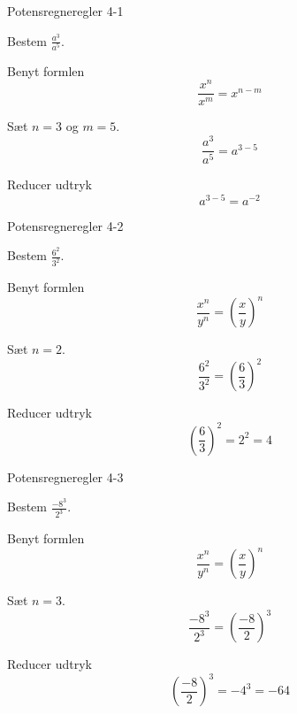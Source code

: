 \documentclass{article}
\begin{document}
\tableofcontents
\newpage

\begin{exercise}{Potensregneregler 4-1}

Bestem $\frac{a^3}{a^5}$.


\hint

Benyt formlen
\[
\frac{x^n}{x^m} = x^{n-m}
\]

\hint

Sæt $n = 3$ og $m=5$.
\[
\frac{a^3}{a^5} = a^{3-5}
\]

\hint 

Reducer udtryk
\[
a^{3-5} = a^{-2}
\]
\end{exercise}

\newpage

\begin{exercise}{Potensregneregler 4-2}
	
	Bestem $\frac{6^2}{3^2}$.
	
	
	\hint
	
	Benyt formlen
	\[
	\frac{x^n}{y^n} = \left( \frac{x}{y}\right)^n
	\]
	
	\hint
	
	Sæt $n = 2$.
	\[
	\frac{6^2}{3^2} = \left(\frac{6}{3}\right)^2
	\]
	
	\hint 
	
	Reducer udtryk
	\[
	\left(\frac{6}{3}\right)^2 = 2^2 = 4
	\]
\end{exercise}

\newpage

\begin{exercise}{Potensregneregler 4-3}
	
	Bestem $\frac{-8^3}{2^3}$.
	
	
	\hint
	
	Benyt formlen
	\[
	\frac{x^n}{y^n} = \left( \frac{x}{y}\right)^n
	\]
	
	\hint
	
	Sæt $n = 3$.
	\[
	\frac{-8^3}{2^3} = \left(\frac{-8}{2}\right)^3
	\]
	
	\hint 
	
	Reducer udtryk
	\[
	\left(\frac{-8}{2}\right)^3 = -4^3 = -64
	\]
\end{exercise}

\newpage
\end{document}
